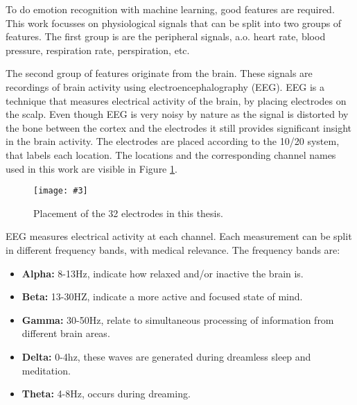 \documentclass[12pt,journal,compsoc]{IEEEtran}
\newcommand{\npar}{\par \vspace{2.3ex plus 0.3ex minus 0.3ex}}
\newcommand{\mijnfiguur}[4][H]{            %
    \begin{figure}[#1]                      %
        \begin{center}                      %
            \texttt{[image: \#3]}        %
            \caption{#4\label{#3}}          %
        \end{center}
    \end{figure}
    }
\begin{document}
\npar

To do emotion recognition with machine learning, good features are required. This work focusses on physiological signals that can be split into two groups of features. The first group is are the peripheral signals, a.o. heart rate, blood pressure, respiration rate, perspiration, etc. 

\npar

The second group of features originate from the brain. These signals are recordings of brain activity using electroencephalography (EEG). EEG is a technique that measures electrical activity of the brain, by placing electrodes on the scalp. Even though EEG is very noisy by nature as the signal is distorted by the bone between the cortex and the electrodes it still provides significant insight in the brain activity. The electrodes are placed according to the 10/20 system, that labels each location. The locations and the corresponding channel names used in this work are visible in Figure \ref{1020labels}.

\mijnfiguur{width=0.5\textwidth}{1020labels}{Placement of the 32 electrodes in this thesis.}

EEG measures electrical activity at each channel. Each measurement can be split in different frequency bands, with medical relevance. The frequency bands are:
\begin{itemize}
\item \textbf{Alpha:} 8-13Hz, indicate how relaxed and/or inactive the brain is.
\item \textbf{Beta:} 13-30HZ, indicate a more active and focused state of mind.
\item \textbf{Gamma:} 30-50Hz, relate to simultaneous processing of information from different brain areas.
\item \textbf{Delta:} 0-4hz, these waves are generated during dreamless sleep and meditation.
\item \textbf{Theta:} 4-8Hz, occurs during dreaming.
\end{itemize}

\end{document}

